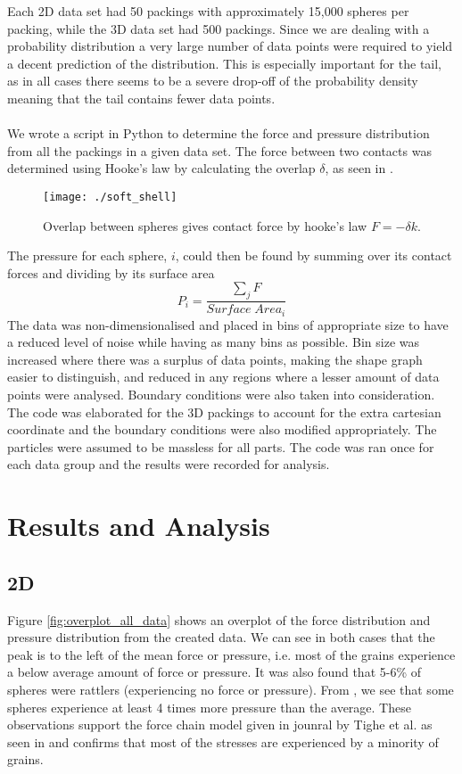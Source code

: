 \documentclass[12pt] {article} %
\begin{document}
Each 2D data set had 50 packings with approximately 15,000 spheres per packing, while the 3D data set had 500 packings. Since we are dealing with a probability distribution a very large number of data points were required to yield a decent prediction of the distribution. This is especially important for the tail, as in all cases there seems to be a severe drop-off of the probability density meaning that the tail contains fewer data points.\\
\\
We wrote a script in Python to determine the force and pressure distribution from all the packings in a given data set. The force between two contacts was determined using Hooke's law by calculating the overlap $\delta$, as seen in .

\begin{figure}[h]
	\centering
	\texttt{[image: ./soft\_shell]}
	\caption{Overlap between spheres gives contact force by hooke's law $F = -\delta k$.}
	\label{fig:soft_shell}
\end{figure}

The pressure for each sphere, $i$, could then be found by summing over its contact forces and dividing by its surface area $$P_i=\dfrac{ \sum_{j}F}{Surface\; Area_i}$$ The data was non-dimensionalised  and placed in bins of appropriate size to have a reduced level of noise while having as many bins as possible. Bin size was increased where there was a surplus of data points, making the shape graph easier to distinguish, and reduced in any regions where a lesser amount of data points were analysed. Boundary conditions were also taken into consideration. The code was elaborated for the 3D packings to account for the extra cartesian coordinate and the boundary conditions were also modified appropriately. The particles were assumed to be massless for all parts. The code was ran once for each data group and the results were recorded for analysis.


\section{Results and Analysis}

	\subsection{2D}
	Figure \ref{fig:overplot_all_data} shows an overplot of the force distribution and pressure distribution from the created data. We can see in both cases that the peak is to the left of the mean force or pressure, i.e. most of the grains experience a below average amount of force or pressure. It was also found that 5-6\% of spheres were rattlers (experiencing no force or pressure). From , we see that some spheres experience at least 4 times more pressure than the average. These observations support the force chain model given in jounral by Tighe et al. \cite{tighejournal} as seen in  and confirms that most of the stresses are experienced by a minority of grains.
\end{document}
